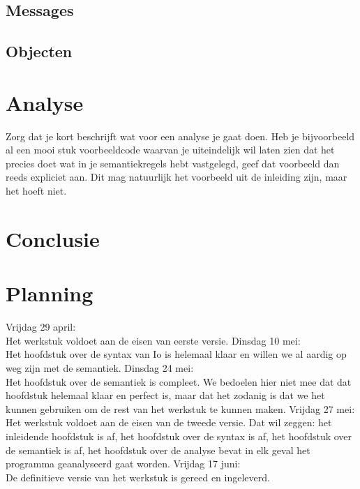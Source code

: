 \documentclass[12pt]{article}
\begin{document}
\subsection{Messages}
\subsection{Objecten}

\section{Analyse}
Zorg dat je kort beschrijft wat voor een analyse je gaat doen. Heb je bijvoorbeeld al een mooi stuk voorbeeldcode waarvan je uiteindelijk wil laten zien dat het precies doet wat in je semantiekregels hebt vastgelegd, geef dat voorbeeld dan reeds expliciet aan. Dit mag natuurlijk het voorbeeld uit de inleiding zijn, maar het hoeft niet.

\section{Conclusie}

\appendix
\section{Planning}
Vrijdag 29 april: \\Het werkstuk voldoet aan de eisen van eerste versie.\newline\newline %
Dinsdag 10 mei: \\Het hoofdstuk over de syntax van Io is helemaal klaar en willen we al aardig op weg zijn met de semantiek.\newline\newline
Dinsdag 24 mei: \\Het hoofdstuk over de semantiek is compleet. We bedoelen hier niet mee dat dat hoofdstuk helemaal klaar en perfect is, maar
dat het zodanig is dat we het kunnen gebruiken om de rest van het werkstuk te kunnen maken.\newline\newline
Vrijdag 27 mei: \\Het werkstuk voldoet aan de eisen van de tweede versie. Dat wil zeggen: het inleidende hoofdstuk is af, het hoofdstuk over de syntax is af, het hoofdstuk over de semantiek is af, het hoofdstuk over de analyse bevat in elk geval het programma geanalyseerd gaat worden.\newline\newline
Vrijdag 17 juni: \\De definitieve versie van het werkstuk is gereed en ingeleverd.
\end{document}
